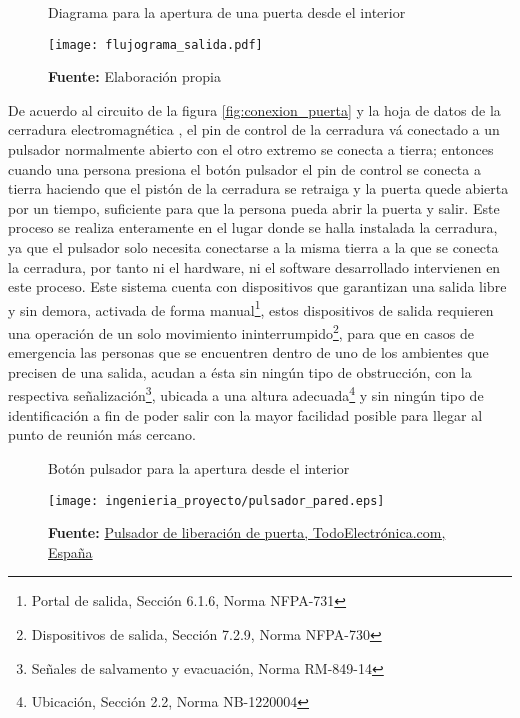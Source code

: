 \documentclass[../principal]{subfiles}
\begin{document}
  \begin{figure}[H]
    \centering
    \caption{Diagrama para la apertura de una puerta desde el interior}
    \texttt{[image: flujograma\_salida.pdf]}
    \caption*{\textbf{Fuente:} Elaboración propia}
    \label{fig:flujo_pulsador}
  \end{figure}

  De acuerdo al circuito de la figura \ref{fig:conexion_puerta} y la hoja de datos de la cerradura electromagnética \cite{datasheet:chapa_tesa}, el pin de control de la cerradura vá conectado a un pulsador normalmente abierto con el otro extremo se conecta a tierra; entonces cuando una persona presiona el botón pulsador el pin de control se conecta a tierra haciendo que el pistón de la cerradura se retraiga y la puerta quede abierta por un tiempo, suficiente para que la persona pueda abrir la puerta y salir. Este proceso se realiza enteramente en el lugar donde se halla instalada la cerradura, ya que el pulsador solo necesita conectarse a la misma tierra a la que se conecta la cerradura, por tanto ni el hardware, ni el software desarrollado intervienen en este proceso. Este sistema cuenta con dispositivos que garantizan  una salida libre y sin demora, activada de forma manual\footnote{Portal de salida, Sección 6.1.6, Norma NFPA-731\cite{norma:nfpa_731}}, estos dispositivos de salida requieren una operación de un solo movimiento ininterrumpido\footnote{Dispositivos de salida, Sección 7.2.9, Norma NFPA-730\cite{norma:nfpa_730}}, para que en casos de emergencia las personas que se encuentren dentro de uno de los ambientes que precisen de una salida, acudan a ésta sin ningún tipo de obstrucción, con la respectiva señalización\footnote{Señales de salvamento y evacuación, Norma RM-849-14\cite{norma:rm_849_14}}, ubicada a una altura adecuada\footnote{Ubicación, Sección 2.2, Norma NB-1220004\cite{norma:nb_1220004}} y sin ningún tipo de identificación a fin de poder salir con la mayor facilidad posible para llegar al punto de reunión más cercano.

  \begin{figure}[H]
    \centering
    \caption{Botón pulsador para la apertura desde el interior}
    \texttt{[image: ingenieria\_proyecto/pulsador\_pared.eps]}
    \caption*{\textbf{Fuente:} \href{https://www.todoelectronica.com/es/pulsador-de-liberacion-de-puerta-salida-de-contacto-no-nc-com-fabricado-en-aluminio-y-acero-p-95904.html}{Pulsador de liberación de puerta, TodoElectrónica.com, España}}
  \end{figure}
\end{document}
